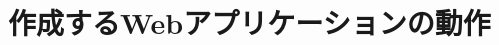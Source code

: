 \documentclass[main]{subfiles}
\begin{document}
\chapter{作成するWebアプリケーションの動作}
\label{cha:appcation_motion}
\end{document}

